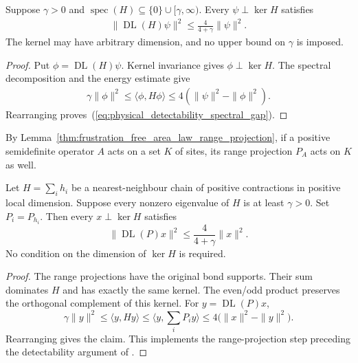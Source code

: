 \begin{lemma}
    \label{thm:physical_detectability_spectral_gap}
    \leanok
    Suppose $\gamma>0$ and
    $\operatorname{spec}(H)\subseteq\{0\}\cup[\gamma,\infty)$.
    Every $\psi\perp\ker H$ satisfies
    \begin{align}
        \|\operatorname{DL}(H)\psi\|^2
        \leq\frac4{4+\gamma}\|\psi\|^2.
        \label{eq:physical_detectability_spectral_gap}
    \end{align}
    The kernel may have arbitrary dimension, and no upper bound on
    $\gamma$ is imposed.
\end{lemma}
\begin{proof}\leanok
    Put $\phi=\operatorname{DL}(H)\psi$. Kernel invariance gives
    $\phi\perp\ker H$. The spectral decomposition and the energy estimate give
    \begin{align}
        \gamma\|\phi\|^2\leq\langle\phi,H\phi\rangle
        \leq4(\|\psi\|^2-\|\phi\|^2).
    \end{align}
    Rearranging proves~(\ref{eq:physical_detectability_spectral_gap}).
\end{proof}

By Lemma~\ref{thm:frustration_free_area_law_range_projection}, if a positive
semidefinite operator $A$ acts on a set $K$ of sites, its range projection
$P_A$ acts on $K$ as well.

\begin{lemma}
    \label{thm:physical_range_detectability}
    \leanok
    Let $H=\sum_i h_i$ be a nearest-neighbour chain of positive contractions
    in positive local dimension. Suppose every nonzero eigenvalue of $H$ is
    at least $\gamma>0$. Set $P_i=P_{h_i}$. Then every
    $x\perp\ker H$ satisfies
    \[
        \|\operatorname{DL}(P)x\|^2
        \le\frac4{4+\gamma}\|x\|^2.
    \]
    No condition on the dimension of $\ker H$ is required.
\end{lemma}
\begin{proof}\leanok
    The range projections have the original bond supports. Their sum dominates
    $H$ and has exactly the same kernel. The even/odd product preserves the
    orthogonal complement of this kernel. For $y=\operatorname{DL}(P)x$,
    \[
        \gamma\|y\|^2\le\langle y,Hy\rangle
        \le\Big\langle y,\sum_iP_i y\Big\rangle
        \le4\bigl(\|x\|^2-\|y\|^2\bigr).
    \]
    Rearranging gives the claim. This implements the range-projection step
    preceding the detectability argument of
    \cite[Section 6.1]{Arad2016RigorousRG}.
\end{proof}

